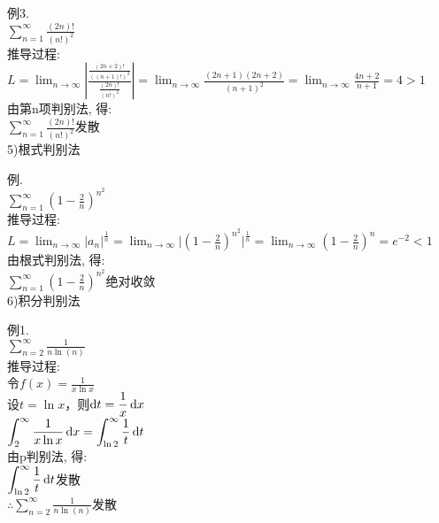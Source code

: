 例3.\\
\phantom{例}$\displaystyle\sum_{n=1}^\infty\frac{(2n)!}{(n!)^2}$\\
推导过程:\\
$\displaystyle L=\lim_{n\to\infty}\left|\frac{\frac{(2n+2)!}{((n+1)!)^2}}{\frac{(2n)!}{(n!)^2}}\right|=\lim_{n\to\infty}\frac{(2n+1)(2n+2)}{(n+1)^2}=\lim_{n\to\infty}\frac{4n+2}{n+1}=4>1$\\
由第n项判别法, 得:\\
$\displaystyle\sum_{n=1}^\infty\frac{(2n)!}{(n!)^2}$发散\\[2ex]

5)根式判别法
{\par\centering
{}
\par}

例.\\
\phantom{例}$\displaystyle\sum_{n=1}^{\infty}(1-\frac{2}{n})^{n^2}$\\[1ex]
推导过程:\\
$\displaystyle L=\lim_{n\to\infty}|a_n|^{\frac{1}{n}}=\lim_{n\to\infty}\Big|(1-\frac{2}{n})^{n^2}\Big|^{\frac{1}{n}}=\lim_{n\to\infty}(1-\frac{2}{n})^n=e^{-2}<1$\\
由根式判别法, 得:\\
$\displaystyle\sum_{n=1}^{\infty}(1-\frac{2}{n})^{n^2}$绝对收敛\\[2ex]

6)积分判别法
{\par\centering
{}
\par}

例1.\\
\phantom{例}$\displaystyle\sum_{n=2}^{\infty}\frac{1}{n\ln(n)}$\\[1ex]
推导过程:\\
令$\displaystyle f(x)=\frac{1}{x\ln x}$\\
设$t=\ln x$，则$\displaystyle\mathop{}\!\mathrm{d} t=\frac{1}{x}\mathop{}\!\mathrm{d} x$\\
$\displaystyle\int_2^{\infty}\frac{1}{x\ln x}\mathop{}\!\mathrm{d} x=\int_{\ln 2}^{\infty}\frac{1}{t}\mathop{}\!\mathrm{d} t$\\
由p判别法, 得:\\
$\displaystyle\int_{\ln 2}^{\infty}\frac{1}{t}\mathop{}\!\mathrm{d} t$发散\\
$\therefore\displaystyle\sum_{n=2}^{\infty}\frac{1}{n\ln(n)}$发散\\[1ex]

